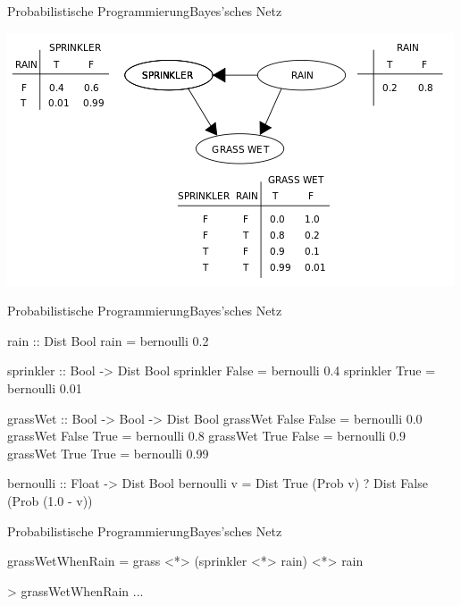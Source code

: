 \documentclass{beamer}
\begin{document}
\begin{frame}{Probabilistische Programmierung}{Bayes'sches Netz}

\includegraphics[width=\textwidth]{images/bayes}

\end{frame}

\begin{frame}[fragile]{Probabilistische Programmierung}{Bayes'sches Netz}
\small
\begin{semiverbatim}
rain :: Dist Bool
rain = bernoulli 0.2

sprinkler :: Bool -> Dist Bool
sprinkler False = bernoulli 0.4
sprinkler True  = bernoulli 0.01

grassWet :: Bool -> Bool -> Dist Bool
grassWet False False = bernoulli 0.0
grassWet False True  = bernoulli 0.8
grassWet True  False = bernoulli 0.9
grassWet True  True  = bernoulli 0.99

bernoulli :: Float -> Dist Bool
bernoulli v = Dist True  (Prob v)
            ? Dist False (Prob (1.0 - v))
\end{semiverbatim}
\end{frame}

\begin{frame}[fragile]{Probabilistische Programmierung}{Bayes'sches Netz}
\small
\begin{semiverbatim}
grassWetWhenRain = grass <*> (sprinkler <*> rain) <*> rain
\end{semiverbatim}
\vfill
\begin{semiverbatim}
> grassWetWhenRain
...
\end{semiverbatim}
\vfill
\end{frame}
\end{document}
